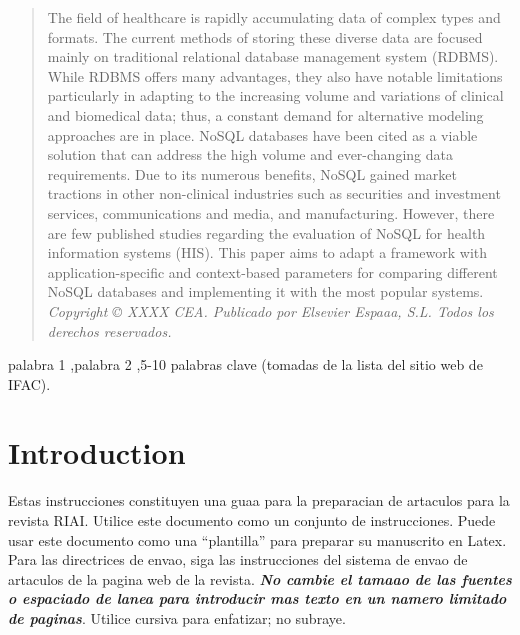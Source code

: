 \documentclass[5p,times,authoryear]{elsarticle}
\begin{document}
\begin{frontmatter}
\begin{abstract}
The field of healthcare is rapidly accumulating data of complex types and formats. The current methods of storing these diverse data are focused mainly on traditional relational database management system (RDBMS). While RDBMS offers many advantages, they also have notable limitations particularly in adapting to the increasing volume and variations of clinical and biomedical data; thus, a constant demand for alternative modeling approaches are in place. NoSQL databases have been cited as a viable solution that can address the high volume and ever-changing data requirements. Due to its numerous benefits, NoSQL gained market tractions in other non-clinical industries such as securities and investment services, communications and media, and manufacturing. However, there are few published studies regarding the evaluation of NoSQL for health information systems (HIS). This paper aims to adapt a framework with application-specific and context-based parameters for comparing different NoSQL databases and implementing it with the most popular systems. \emph{Copyright {\copyright} XXXX CEA. Publicado por Elsevier Espaaa, S.L. Todos los derechos reservados.}
\end{abstract}

\begin{keyword}

palabra 1 \sep palabra 2 \sep 5-10 palabras clave (tomadas de la lista del sitio web de IFAC).

\end{keyword}

\end{frontmatter}


\section{Introduction}
Estas instrucciones constituyen una guaa para la preparacian de
artaculos para la revista RIAI. Utilice este documento como un
conjunto de instrucciones. Puede usar este documento como
una ``plantilla'' para preparar su manuscrito en Latex. Para las directrices
de envao, siga las instrucciones del sistema de envao de artaculos
de la pagina web de la revista.
 {\bf{\emph {No cambie el tamaao de las fuentes o espaciado de lanea para introducir mas texto en un namero limitado de paginas}}}.  Utilice cursiva para enfatizar; no subraye.
\end{document}
